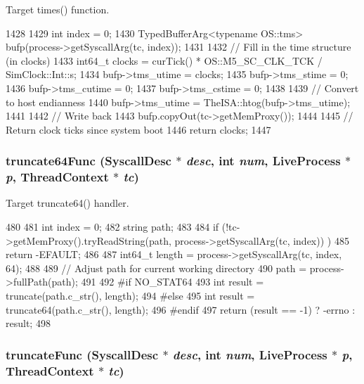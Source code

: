 Target times() function. 


\begin{DoxyCode}
1428 {
1429     int index = 0;
1430     TypedBufferArg<typename OS::tms> bufp(process->getSyscallArg(tc, index));
1431 
1432     // Fill in the time structure (in clocks)
1433     int64_t clocks = curTick() * OS::M5_SC_CLK_TCK / SimClock::Int::s;
1434     bufp->tms_utime = clocks;
1435     bufp->tms_stime = 0;
1436     bufp->tms_cutime = 0;
1437     bufp->tms_cstime = 0;
1438 
1439     // Convert to host endianness
1440     bufp->tms_utime = TheISA::htog(bufp->tms_utime);
1441 
1442     // Write back
1443     bufp.copyOut(tc->getMemProxy());
1444 
1445     // Return clock ticks since system boot
1446     return clocks;
1447 }
\end{DoxyCode}
\hypertarget{syscall__emul_8hh_ae8fe2ae6e9a7f93b2fec78dd445ee0bd}{
\subsubsection[{truncate64Func}]{ truncate64Func ({\bf SyscallDesc} $\ast$ {\em desc}, \/  int {\em num}, \/  {\bf LiveProcess} $\ast$ {\em p}, \/  {\bf ThreadContext} $\ast$ {\em tc})}}
\label{syscall__emul_8hh_ae8fe2ae6e9a7f93b2fec78dd445ee0bd}


Target truncate64() handler. 


\begin{DoxyCode}
480 {
481     int index = 0;
482     string path;
483 
484     if (!tc->getMemProxy().tryReadString(path, process->getSyscallArg(tc, index))
      )
485        return -EFAULT;
486 
487     int64_t length = process->getSyscallArg(tc, index, 64);
488 
489     // Adjust path for current working directory
490     path = process->fullPath(path);
491 
492 #if NO_STAT64
493     int result = truncate(path.c_str(), length);
494 #else
495     int result = truncate64(path.c_str(), length);
496 #endif
497     return (result == -1) ? -errno : result;
498 }
\end{DoxyCode}
\hypertarget{syscall__emul_8hh_a6e21e57c806344e2ecbb7d2c952af5f9}{
\subsubsection[{truncateFunc}]{ truncateFunc ({\bf SyscallDesc} $\ast$ {\em desc}, \/  int {\em num}, \/  {\bf LiveProcess} $\ast$ {\em p}, \/  {\bf ThreadContext} $\ast$ {\em tc})}}
\label{syscall__emul_8hh_a6e21e57c806344e2ecbb7d2c952af5f9}


